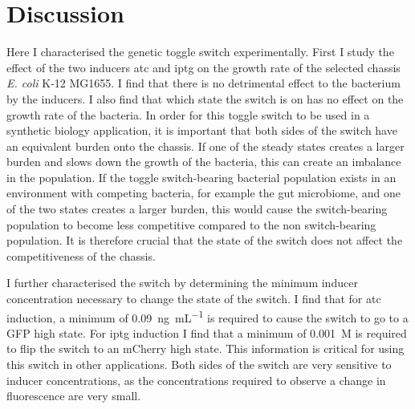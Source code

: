  
 

\section{Discussion}

Here I characterised the genetic toggle switch experimentally. First I study the effect of the two inducers \acrshort{atc} and \acrshort{iptg} on the growth rate of the selected chassis \textit{E. coli} K-12 MG1655. I find that there is no detrimental effect to the bacterium by the inducers. I also find that which state the switch is on has no effect on the growth rate of the bacteria. In order for this toggle switch to be used in a synthetic biology application, it is important that both sides of the switch have an equivalent burden onto the chassis. If one of the steady states creates a larger burden and slows down the growth of the bacteria, this can create an imbalance in the population. If the toggle switch-bearing bacterial population exists in an environment with competing bacteria, for example the gut microbiome, and one of the two states creates a larger burden, this would cause the switch-bearing population to become less competitive compared to the non switch-bearing population. It is therefore crucial that the state of the switch does not affect the competitiveness of the chassis.  


I further characterised the switch by determining the minimum inducer concentration necessary to change the state of the switch. I find that for \acrshort{atc} induction, a minimum of \SI{0.09}{\nano\gram\per\milli\liter} is required to cause the switch to go to a GFP high state. For \acrshort{iptg} induction I find that a minimum of \SI{0.001}{M} is required to flip the switch to an mCherry high state. This information is critical for using this switch in other applications. Both sides of the switch are very sensitive to inducer concentrations, as the concentrations required to observe a change in fluorescence are very small. 

